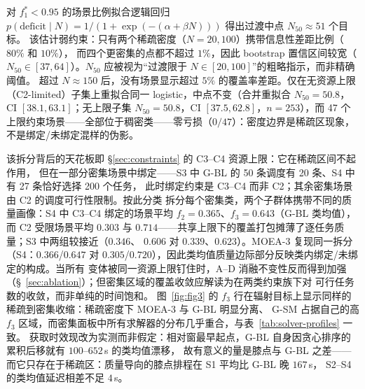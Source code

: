 \documentclass[preprint,12pt,authoryear]{elsarticle}
\begin{document}
对 $f_1^* < 0.95$ 的场景比例拟合逻辑回归 $p(\text{deficit} \mid N) = 1 / (1 + \exp(-(\alpha + \beta N)))$
得出过渡中点 $N_{50} \approx 51$ 个目标。
该估计弱约束：只有两个稀疏密度（$N=20, 100$）携带信息性差距比例（$80\%$ 和 $10\%$），
而四个更密集的点都不超过 $1\%$，因此 bootstrap 置信区间较宽（$N_{50} \in [37, 64]$）。$N_{50}$ 应被视为“过渡限于 $N \in [20, 100]$”的粗略指示，而非精确阈值。
超过 $N \approx 150$ 后，没有场景显示超过 $5\%$ 的覆盖率差距。仅在无资源上限（C2-limited）子集上重拟合同一 logistic，中点不变（合并重拟合 $N_{50} = 50.8$，CI $[38.1, 63.1]$；无上限子集 $N_{50} = 50.8$，CI $[37.5, 62.8]$，$n=253$），而 47 个上限约束场景——全部位于稠密类——零亏损（$0/47$）：密度边界是稀疏区现象，不是绑定/未绑定混样的伪影。

该拆分背后的天花板即 \S\ref{sec:constraints} 的 C3--C4 资源上限：它在稀疏区间不起作用，
但在一部分密集场景中绑定——S3 中 G-BL 的 50 条调度有 20 条、S4 中有 27 条恰好选择 200 个任务，
此时绑定约束是 C3--C4 而非 C2；其余密集场景由 C2 的调度可行性限制。按此分类
拆分每个密集类，两个子群体携带不同的质量画像：S4 中 C3--C4 绑定的场景平均
$f_2 = 0.365$、$f_3 = 0.643$（G-BL 类均值），而 C2 受限场景平均 $0.303$ 与
$0.714$——共享上限下的覆盖打包摊薄了逐任务质量；S3 中两组较接近（$0.346$、
$0.606$ 对 $0.339$、$0.623$）。MOEA-3 复现同一拆分（S4：$0.366$/$0.647$ 对
$0.305$/$0.720$），因此类均值质量边际部分反映类内绑定/未绑定的构成。当所有
变体被同一资源上限钉住时，A--D 消融不变性反而得到加强
（\S~\ref{sec:ablation}）；但密集区域的覆盖收敛应解读为在两类约束族下对
可行任务数的收敛，而非单纯的时间饱和。
图~\ref{fig:fig3} 的 $f_3$ 行在辐射目标上显示同样的稀疏到密集收缩：稀疏密度下 MOEA-3 与 G-BL 明显分离、
G-SM 占据自己的高 $f_3$ 区域，而密集面板中所有求解器的分布几乎重合，与表~\ref{tab:solver-profiles} 一致。
获取时效现改为实测而非假定：相对窗最早起点，G-BL 自身因贪心排序的累积后移就有 $100$--$652$\,s 的类均值漂移，
故有意义的量是膝点与 G-BL 之差——而它只存在于稀疏区：质量导向的膝点排程在 S1 平均比 G-BL 晚 $167$\,s，
S2--S4 的类均值延迟相差不足 $4$\,s。

\end{document}
